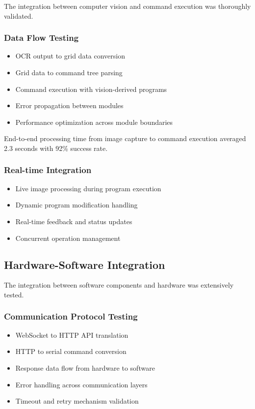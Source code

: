 The integration between computer vision and command execution was thoroughly validated.

\subsubsection{Data Flow Testing}
\begin{itemize}
    \item OCR output to grid data conversion
    \item Grid data to command tree parsing
    \item Command execution with vision-derived programs
    \item Error propagation between modules
    \item Performance optimization across module boundaries
\end{itemize}

End-to-end processing time from image capture to command execution averaged 2.3 seconds with 92\% success rate.

\subsubsection{Real-time Integration}
\begin{itemize}
    \item Live image processing during program execution
    \item Dynamic program modification handling
    \item Real-time feedback and status updates
    \item Concurrent operation management
\end{itemize}

\subsection{Hardware-Software Integration}

The integration between software components and hardware was extensively tested.

\subsubsection{Communication Protocol Testing}
\begin{itemize}
    \item WebSocket to HTTP API translation
    \item HTTP to serial command conversion
    \item Response data flow from hardware to software
    \item Error handling across communication layers
    \item Timeout and retry mechanism validation
\end{itemize}

